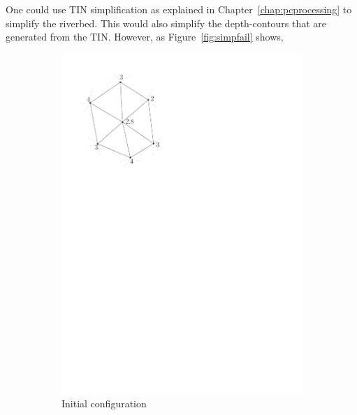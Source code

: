 One could use TIN simplification as explained in Chapter~\ref{chap:pcprocessing} to simplify the riverbed.
This would also simplify the depth-contours that are generated from the TIN. 
However, as Figure~\ref{fig:simpfail} shows, 
\begin{figure}
\centering
  \begin{subfigure}[b]{0.2\linewidth}
    \centering
    \includegraphics[width=\textwidth,page=1]{figs/simpfail.pdf}
    \caption{Initial configuration}\label{fig:simpfail:a}
  \end{subfigure}
  \qquad
  \begin{subfigure}[b]{0.2\linewidth}
    \centering

\end{subfigure}
\end{figure}
